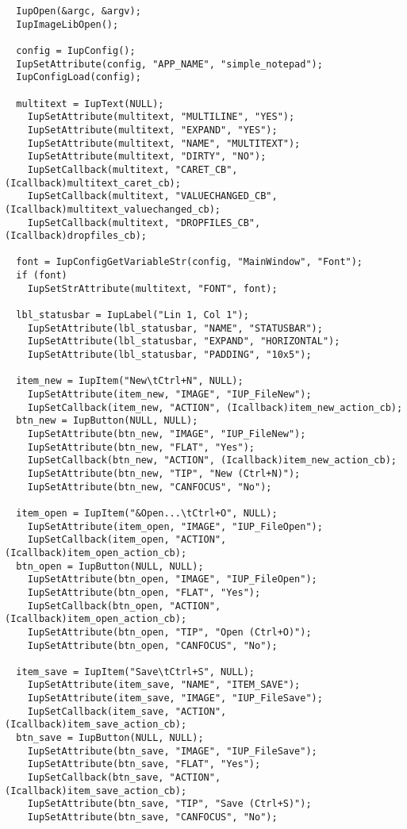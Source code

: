 \documentclass{ctexart}
\begin{document}
\begin{lstlisting}
  IupOpen(&argc, &argv);
  IupImageLibOpen();

  config = IupConfig();
  IupSetAttribute(config, "APP_NAME", "simple_notepad");
  IupConfigLoad(config);

  multitext = IupText(NULL);
    IupSetAttribute(multitext, "MULTILINE", "YES");
    IupSetAttribute(multitext, "EXPAND", "YES");
    IupSetAttribute(multitext, "NAME", "MULTITEXT");
    IupSetAttribute(multitext, "DIRTY", "NO");
    IupSetCallback(multitext, "CARET_CB", (Icallback)multitext_caret_cb);
    IupSetCallback(multitext, "VALUECHANGED_CB", (Icallback)multitext_valuechanged_cb);
    IupSetCallback(multitext, "DROPFILES_CB", (Icallback)dropfiles_cb);

  font = IupConfigGetVariableStr(config, "MainWindow", "Font");
  if (font)
    IupSetStrAttribute(multitext, "FONT", font);

  lbl_statusbar = IupLabel("Lin 1, Col 1");
    IupSetAttribute(lbl_statusbar, "NAME", "STATUSBAR");  
    IupSetAttribute(lbl_statusbar, "EXPAND", "HORIZONTAL");
    IupSetAttribute(lbl_statusbar, "PADDING", "10x5");

  item_new = IupItem("New\tCtrl+N", NULL);
    IupSetAttribute(item_new, "IMAGE", "IUP_FileNew");
    IupSetCallback(item_new, "ACTION", (Icallback)item_new_action_cb);
  btn_new = IupButton(NULL, NULL);
    IupSetAttribute(btn_new, "IMAGE", "IUP_FileNew");
    IupSetAttribute(btn_new, "FLAT", "Yes");
    IupSetCallback(btn_new, "ACTION", (Icallback)item_new_action_cb);
    IupSetAttribute(btn_new, "TIP", "New (Ctrl+N)");
    IupSetAttribute(btn_new, "CANFOCUS", "No");

  item_open = IupItem("&Open...\tCtrl+O", NULL);
    IupSetAttribute(item_open, "IMAGE", "IUP_FileOpen");
    IupSetCallback(item_open, "ACTION", (Icallback)item_open_action_cb);
  btn_open = IupButton(NULL, NULL);
    IupSetAttribute(btn_open, "IMAGE", "IUP_FileOpen");
    IupSetAttribute(btn_open, "FLAT", "Yes");
    IupSetCallback(btn_open, "ACTION", (Icallback)item_open_action_cb);
    IupSetAttribute(btn_open, "TIP", "Open (Ctrl+O)");
    IupSetAttribute(btn_open, "CANFOCUS", "No");

  item_save = IupItem("Save\tCtrl+S", NULL);
    IupSetAttribute(item_save, "NAME", "ITEM_SAVE");
    IupSetAttribute(item_save, "IMAGE", "IUP_FileSave");
    IupSetCallback(item_save, "ACTION", (Icallback)item_save_action_cb);
  btn_save = IupButton(NULL, NULL);
    IupSetAttribute(btn_save, "IMAGE", "IUP_FileSave");
    IupSetAttribute(btn_save, "FLAT", "Yes");
    IupSetCallback(btn_save, "ACTION", (Icallback)item_save_action_cb);
    IupSetAttribute(btn_save, "TIP", "Save (Ctrl+S)");
    IupSetAttribute(btn_save, "CANFOCUS", "No");


\end{lstlisting}
\end{document}
